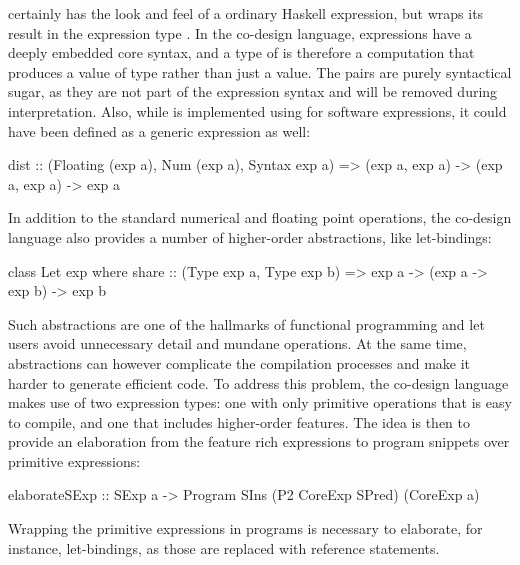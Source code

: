 \documentclass[../paper.tex]{subfiles}
\begin{document}
 certainly has the look and feel of a ordinary Haskell expression, but wraps its result  in the expression type . In the co-design language, expressions have a deeply embedded core syntax, and a type of  is therefore a computation that produces a value of type  rather than just a value. The pairs are purely syntactical sugar, as they are not part of the expression syntax and will be removed during interpretation. Also, while  is implemented using  for software expressions, it could have been defined as a generic expression as well:

\begin{code}
dist :: (Floating (exp a), Num (exp a), Syntax exp a) =>
        (exp a, exp a) -> (exp a, exp a) -> exp a
\end{code}

In addition to the standard numerical and floating point operations, the co-design language also provides a number of higher-order abstractions, like let-bindings:

\begin{code}
class Let exp where
  share :: (Type exp a, Type exp b) => exp a -> (exp a -> exp b) -> exp b
\end{code}

\noindent Such abstractions are one of the hallmarks of functional programming and let users avoid unnecessary detail and mundane operations. At the same time, abstractions can however complicate the compilation processes and make it harder to generate efficient code. To address this problem, the co-design language makes use of two expression types: one with only primitive operations that is easy to compile, and one that includes higher-order features. The idea is then to provide an elaboration from the feature rich expressions to program snippets over primitive expressions:


\begin{code}
elaborateSExp :: SExp a -> Program SIns (P2 CoreExp SPred) (CoreExp a)
\end{code}

\noindent Wrapping the primitive expressions in programs is necessary to elaborate, for instance, let-bindings, as those are replaced with reference statements.
\end{document}

